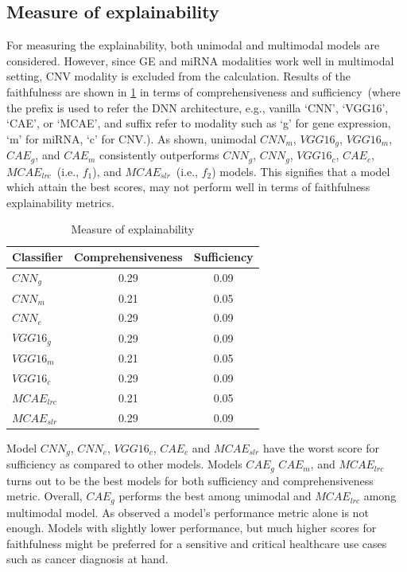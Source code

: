 \subsection{Measure of explainability}
For measuring the explainability, both unimodal and multimodal models are considered. However, since GE and miRNA modalities work well in multimodal setting, CNV modality is excluded from the calculation. Results of the faithfulness are shown in \cref{tab:faithfullness_result} in terms of comprehensiveness and sufficiency~(where the prefix is used to refer the DNN architecture, e.g., vanilla `CNN', `VGG16', `CAE', or `MCAE', and suffix refer to modality such as `g' for gene expression, `m' for miRNA, `c' for CNV.). As shown, unimodal $CNN_{m}$, $VGG16_{g}$, $VGG16_{m}$, $CAE_{g}$, and $CAE_{m}$ consistently outperforms $CNN_{g}$, $CNN_{g}$, $VGG16_{c}$, $CAE_{c}$, $MCAE_{lrc}$~(i.e., $f_1$), and $MCAE_{slr}$~(i.e., $f_2$) models. This signifies that a model which attain the best scores, %
may not perform well in terms of faithfulness explainability metrics.  

\begin{table}[h]
    \centering
    \caption{Measure of explainability}
    \begin{tabular}{l|c|c}
        \hline \textbf{Classifier} & \textbf{Comprehensiveness} & \textbf{Sufficiency} \\ 
        \hline $CNN_{g}$ & 0.29 & 0.09 \\ \hline 
        $CNN_{m}$ & 0.21 & 0.05 \\
        \hline $CNN_{c}$ & 0.29 & 0.09 \\  
        \hline $VGG16_{g}$ & 0.29 & 0.09 \\ \hline 
        $VGG16_{m}$ & 0.21 & 0.05 \\
        \hline $VGG16_{c}$ & 0.29 & 0.09 \\ \hline 
        $MCAE_{lrc}$ & 0.21 & 0.05 \\
        \hline $MCAE_{slr}$ & 0.29 & 0.09 \\ 
        \hline
    \end{tabular}
    \label{tab:faithfullness_result}
\end{table}

\hspace*{3.5mm} Model $CNN_{g}$, $CNN_{c}$, $VGG16_{c}$, $CAE_{c}$ and $MCAE_{slr}$ have the worst score for sufficiency as compared to other models. Models $CAE_{g}$  $CAE_{m}$, and $MCAE_{lrc}$ turns out to be the best models for both sufficiency and comprehensiveness metric. Overall, $CAE_{g}$ performs the best among unimodal and $MCAE_{lrc}$ among multimodal model. As observed a model’s performance metric alone is not enough. Models with slightly lower performance, but much higher scores for faithfulness might be preferred for a sensitive and critical healthcare use cases such as cancer diagnosis at hand. 

